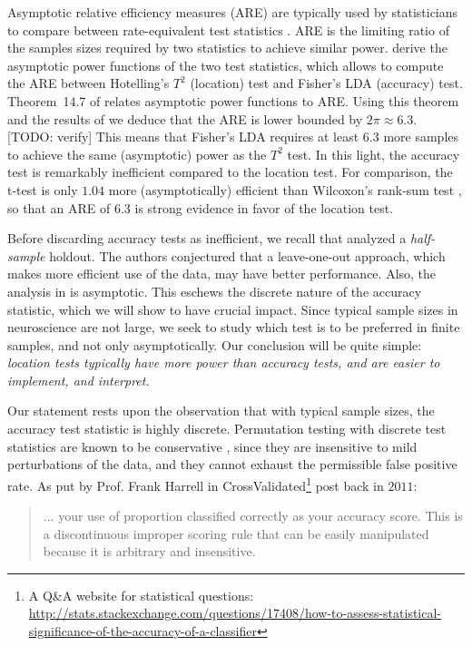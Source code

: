 \documentclass[12pt,a4paper]{article}
\begin{document}
Asymptotic relative efficiency measures (ARE) are typically used by statisticians to compare between rate-equivalent test statistics \citep{vaart_asymptotic_1998}.
ARE is the limiting ratio of the samples sizes required by two statistics to achieve similar power. 
\cite{ramdas_classification_2016} derive the asymptotic power functions of the two test statistics, which allows to compute the ARE between Hotelling's $T^2$ (location) test and Fisher's LDA (accuracy) test.
Theorem~14.7 of \cite{vaart_asymptotic_1998} relates asymptotic power functions to ARE.
Using this theorem and the results of \cite{ramdas_classification_2016} we deduce that the ARE is lower bounded by $2 \pi \approx 6.3$. [TODO: verify]
This means that Fisher's LDA requires at least $6.3$ more samples to achieve the same (asymptotic) power as the $T^2$ test. 
In this light, the accuracy test is remarkably inefficient compared to the location test.  
For comparison, the t-test is only $1.04$ more (asymptotically) efficient than Wilcoxon's rank-sum test \citep{lehmann_parametric_2009}, so that an ARE of $6.3$ is strong evidence in favor of the location test. 

Before discarding accuracy tests as inefficient, we recall that \cite{ramdas_classification_2016} analyzed a \emph{half-sample} holdout. 
The authors conjectured that a leave-one-out approach, which makes more efficient use of the data, may have better performance. 
Also, the analysis in \cite{ramdas_classification_2016} is asymptotic. 
This eschews the discrete nature of the accuracy statistic, which we will show to have  crucial impact. 
Since typical sample sizes in neuroscience are not large, we seek to study which test is to be preferred in finite samples, and not only asymptotically.
Our conclusion will be quite simple: {\em location tests typically have more power than accuracy tests, and are easier to implement, and interpret.}

Our statement rests upon the observation that with typical sample sizes, the accuracy test statistic is highly discrete. 
Permutation testing with discrete test statistics are known to be conservative \citep{hemerik_exact_2014}, since they are insensitive to mild perturbations of the data, and they cannot exhaust the permissible false positive rate. 
As put by Prof. Frank Harrell in \textsf{CrossValidated\footnote{A Q\&A website for statistical questions: \url{http://stats.stackexchange.com/questions/17408/how-to-assess-statistical-significance-of-the-accuracy-of-a-classifier}}} post back in $2011$:
\begin{quote}
	... your use of proportion classified correctly as your accuracy score. This is a discontinuous improper scoring rule that can be easily manipulated because it is arbitrary and insensitive.
\end{quote}
\end{document}
